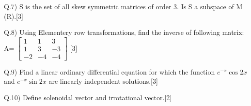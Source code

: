 \documentclass[12pt]{article}
\begin{document}
\begin{flushleft}
Q.7) S is the set of all skew symmetric matrices of order 3. Is S a subspace of M (R).\hspace{11.5cm}[3]
\end{flushleft}

\begin{flushleft}
Q.8) Using Elementery row transformations, find the inverse of following matrix:\\
A=
$\begin{bmatrix}
1 & 1 & 3\\
1 & 3 & -3\\
-2 & -4 & -4
\end{bmatrix}$
\hspace{9.5cm}[3]
\end{flushleft}

\begin{flushleft}
Q.9) Find a linear ordinary differential equation for which the function $e^{-x}\cos{2x}$ and $e^{-x}\sin{2x}$ are linearly independent solutions.\hspace{2.5cm}[3]
\end{flushleft}

\begin{flushleft}
Q.10) Define solenoidal vector and irrotational vector.\hspace{3.5cm}[2]
\end{flushleft}



\begin{flushleft}

\end{flushleft}
\end{document}
